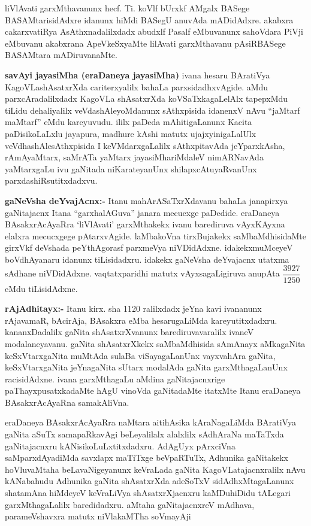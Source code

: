 liVlAvati garxMthavanunx hecf. Ti. koVlf bUrxkf AMgalx BASege BASAMtarisidAdxre idanunx hiMdi BASegU anuvAda mADidAdxre. akabxra cakarxvatiRya AsAthxna\-dalilxdadx abudxlf Pasalf eMbuvanunx sahoVdara PiVji eMbuvanu akabxrana ApeVkeSxyaMte lilAvati garxMthavanu pAsiRBASege BASAMtara mADiruvanaMte.

\textbf{savAyi jayasiMha (eraDaneya jayasiMha)}
ivana hesaru BAratiVya KagoVLashAsatxrXda cariterxyalilx bahaLa parxsidadhxvAgide. aMdu parxcAradalilxdadx KagoVLa shAsatxrXda koVSaTxkagaLelAlx tapepxMdu tiLidu dehaliyalilx veVdashAleyoMdanunx sAthxpisida idanenxV nAvu ``jaMtarf maMtarf'' eMdu kareyuvudu. 
ililx paDeda mAhitigaLanunx Kacita paDisikoLaLxlu jayapura, madhure kAshi matutx ujajxyinigaLalUlx veVdhashAlesAthxpisida I keVMdarxgaLalilx sAthxpitavAda jeYparxkAsha, rAmAyaMtarx, saMrATa yaMtarx jayasiMhariMdaleV nimARNavAda yaMtarxgaLu ivu gaNitada niKarateyanUnx shilapxcAtuyaRvanUnx parxdashiRsutitxdadxvu.

\textbf{gaNeVsha deYvajAcnx:-} Itanu mahArASaTxrXdavanu bahaLa janapirxya gaNitajacnx Itana ``garxhalAGuva'' janara mecucxge paDedide. eraDaneya BAsakxrAcAyaRra `liVlAvati' garxMthakekx ivanu barediruva vAyxKAyxna elalxra mecucxgege pAtarxvAgide. laMbakoVna tirxBujakekx saMbaMdhisidaMte girxVkf deVshada peYthAgorasf parxmeVya niVDidAdxne. idakekx\break muMceyeV boVdhAyanaru idanunx tiLisidadxru. idakekx gaNeVsha deYvajacnx utatxma sAdhane niVDidAdxne.
vaqtatxparidhi matutx vAyxsagaLigiruva anupAta $\dfrac{3927}{1250}$ eMdu tiLisidAdxne.

\textbf{rAjAdhitayx:-} Itanu kirx. sha {\rm 1120} ralilxdadx jeYna kavi ivananunx rAjavamaR, bAcirAja, BAsakxra eMba hesarugaLiMda kareyutitxdadxru. kananxDadalilx gaNita shAsatxrXvanunx barediruvavaralilx ivaneV modalaneyavanu. gaNita shAsatxrXkekx saMbaMdhisida sAmAnayx aMkagaNita keSxVtarxgaNita muMtAda sulaBa viSayagaLanUnx vayxvahAra gaNita, keSxVtarxgaNita jeYnagaNita sUtarx modalAda gaNita garxMthagaLanUnx racisidAdxne. ivana garxMthagaLu aMdina gaNitajacnxrige paThayxpusatxkadaMte hAgU vinoVda gaNitadaMte itatxMte Itanu eraDaneya BAsakxrAcAyaRna samakAliVna.

eraDaneya BAsakxrAcAyaRra naMtara aitihAsika kAraNagaLiMda BAratiVya gaNita aSuTx samapaRkavAgi beLeyalilalx alalxlilx sAdhAraNa maTaTxda gaNitajacnxru kANisikoLuLxtitxdadxru. AdAgUyx pArxciVna saMparxdAyadiMda savxlapx maTiTxge beVpaRTuTx, Adhunika gaNitakekx hoVluvaMtaha beLavaNigeyanunx keVraLada gaNita KagoVLatajacnxralilx nAvu kANabahudu Adhunika gaNita shAsatxrXda adeSoTxV sidAdhxMtagaLanunx shatamAna hiMdeyeV keVraLiVya shAsatxrXjacnxru kaMDuhiDidu tALegari garxMthagaLalilx baredidadxru. aMtaha gaNitajacnxreV mAdhava, parameVshavxra matutx niVlakaMTha soVmayAji

